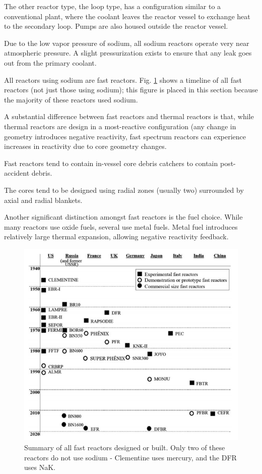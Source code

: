 \documentclass[10pt]{article}
\numberwithin{equation}{section} %
\begin{document}
The other reactor type, the loop type, has a configuration similar to a conventional plant, where the coolant leaves the reactor vessel to exchange heat to the secondary loop. Pumps are also housed outside the reactor vessel.

Due to the low vapor pressure of sodium, all sodium reactors operate very near atmospheric pressure. A slight pressurization exists to ensure that any leak goes out from the primary coolant. 

All reactors using sodium are fast reactors. Fig. \ref{fig:FastReactorTimeline} shows a timeline of all fast reactors (not just those using sodium); this figure is placed in this section because the majority of these reactors used sodium. 

A substantial difference between fast reactors and thermal reactors is that, while thermal reactors are design in a most-reactive configuration (any change in geometry introduces negative reactivity, fast spectrum reactors can experience increases in reactivity due to core geometry changes. 

Fast reactors tend to contain in-vessel core debris catchers to contain post-accident debris. 

The cores tend to be designed using radial zones (usually two) surrounded by axial and radial blankets. 

Another significant distinction amongst fast reactors is the fuel choice. While many reactors use oxide fuels, several use metal fuels. Metal fuel introduces relatively large thermal expansion, allowing negative reactivity feedback. 

\begin{figure}[H]
\centering
\includegraphics[width=0.6\linewidth]{figures/FastReactorRecord.pdf}
\caption{Summary of all fast reactors designed or built. Only two of these reactors do not use sodium - Clementine uses mercury, and the DFR uses NaK.}
\label{fig:FastReactorTimeline}
\end{figure}
\end{document}
